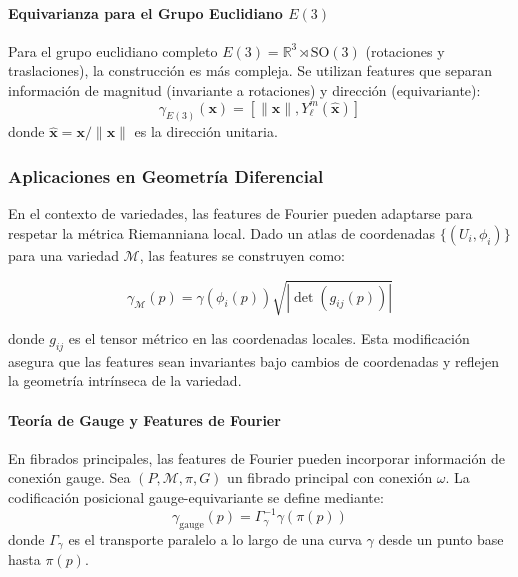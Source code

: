 \paragraph{Equivarianza para el Grupo Euclidiano $E(3)$}

Para el grupo euclidiano completo $E(3) = \mathbb{R}^3 \rtimes \text{SO}(3)$ (rotaciones y traslaciones), la construcción es más compleja. Se utilizan features que separan información de magnitud (invariante a rotaciones) y dirección (equivariante):
\begin{equation}
\gamma_{E(3)}(\mathbf{x}) = [\|\mathbf{x}\|, Y_\ell^m(\hat{\mathbf{x}})]
\end{equation}
donde $\hat{\mathbf{x}} = \mathbf{x}/\|\mathbf{x}\|$ es la dirección unitaria.

\subsubsection{Aplicaciones en Geometría Diferencial}

En el contexto de variedades, las features de Fourier pueden adaptarse para respetar la métrica Riemanniana local. Dado un atlas de coordenadas $\{(U_i, \phi_i)\}$ para una variedad $\mathcal{M}$, las features se construyen como:

\begin{equation}
\gamma_{\mathcal{M}}(p) = \gamma(\phi_i(p)) \sqrt{|\det(g_{ij}(p))|}
\end{equation}

donde $g_{ij}$ es el tensor métrico en las coordenadas locales. Esta modificación asegura que las features sean invariantes bajo cambios de coordenadas y reflejen la geometría intrínseca de la variedad.

\paragraph{Teoría de Gauge y Features de Fourier}

En fibrados principales, las features de Fourier pueden incorporar información de conexión gauge. Sea $(P, \mathcal{M}, \pi, G)$ un fibrado principal con conexión $\omega$. La codificación posicional gauge-equivariante se define mediante:
\begin{equation}
\gamma_{\text{gauge}}(p) = \Gamma_\gamma^{-1} \gamma(\pi(p))
\end{equation}
donde $\Gamma_\gamma$ es el transporte paralelo a lo largo de una curva $\gamma$ desde un punto base hasta $\pi(p)$.

